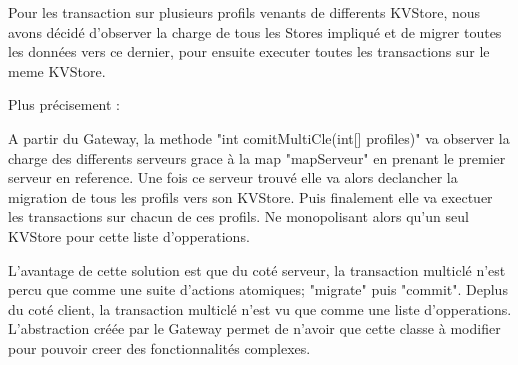 Pour les transaction sur plusieurs profils venants de differents KVStore, nous avons décidé d'observer la charge de tous les Stores impliqué et de migrer toutes les données vers ce dernier, pour ensuite executer toutes les transactions sur le meme KVStore.

Plus précisement :

A partir du Gateway, la methode "int comitMultiCle(int[] profiles)" va observer la charge des differents serveurs grace à la map "mapServeur" en prenant le premier serveur en reference. Une fois ce serveur trouvé elle va alors declancher la migration de tous les profils vers son KVStore. Puis finalement elle va exectuer les transactions sur chacun de ces profils. Ne monopolisant alors qu'un seul KVStore pour cette liste d'opperations.

L'avantage de cette solution est que du coté serveur, la transaction multiclé n'est percu que comme une suite d'actions atomiques; "migrate" puis "commit".
Deplus du coté client, la transaction multiclé n'est vu que comme une liste d'opperations. L'abstraction créée par le Gateway permet de n'avoir que cette classe à modifier pour pouvoir creer des fonctionnalités complexes.


